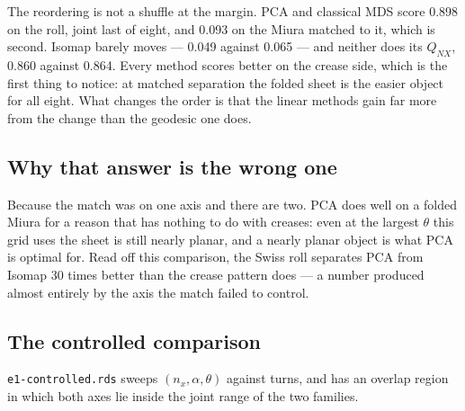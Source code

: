 \documentclass[
  british,
  a4paper,
]{book}
\begin{document}
The reordering is not a shuffle at the margin. PCA and classical MDS score
0.898 on the roll, joint last of
eight, and 0.093 on the Miura matched
to it, which is second. Isomap barely moves ---
0.049 against
0.065 --- and neither does its
\(Q_{NX}\), 0.860 against
0.864. Every method scores better
on the crease side, which is the first thing to notice: at matched separation the
folded sheet is the easier object for all eight. What changes the order is that
the linear methods gain far more from the change than the geodesic one does.

\subsection{Why that answer is the wrong one}\label{why-that-answer-is-the-wrong-one}

Because the match was on one axis and there are two. PCA does well on a folded
Miura for a reason that has nothing to do with creases: even at the largest
\(\theta\) this grid uses the sheet is still nearly planar, and a nearly planar
object is what PCA is optimal for. Read off this comparison, the Swiss roll
separates PCA from Isomap 30 times better than the crease
pattern does --- a number produced almost entirely by the axis the match failed to
control.

\subsection{The controlled comparison}\label{the-controlled-comparison}

\texttt{e1-controlled.rds} sweeps \((n_x, \alpha, \theta)\) against turns, and has an
overlap region in which both axes lie inside the joint range of the two families.
\end{document}
